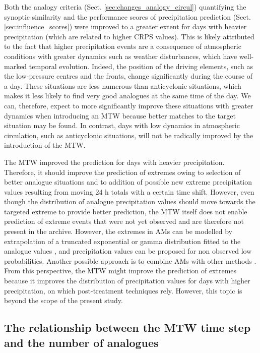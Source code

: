\documentclass[hess, manuscript]{copernicus}
\begin{document}
	Both the analogy criteria (Sect. \ref{sec:changes_analogy_circul}) quantifying the synoptic similarity and the performance scores of precipitation prediction (Sect. \ref{sec:influence_scores}) were improved to a greater extent for days with heavier precipitation (which are related to higher CRPS values). This is likely attributed to the fact that higher precipitation events are a consequence of atmospheric conditions with greater dynamics such as weather disturbances, which have well-marked temporal evolution. Indeed, the position of the driving elements, such as the low-pressure centres and the fronts, change significantly during the course of a day. These situations are less numerous than anticyclonic situations, which makes it less likely to find very good analogues at the same time of the day. We can, therefore, expect to more significantly improve these situations with greater dynamics when introducing an MTW because better matches to the target situation may be found. In contrast, days with low dynamics in atmospheric circulation, such as anticyclonic situations, will not be radically improved by the introduction of the MTW.
	
	The MTW improved the prediction for days with heavier precipitation. Therefore, it should improve the prediction of extremes owing to selection of better analogue situations and to addition of possible new extreme precipitation values resulting from moving 24 h totals with a certain time shift. However, even though the distribution of analogue precipitation values should move towards the targeted extreme to provide better prediction, the MTW itself does not enable prediction of extreme events that were not yet observed and are therefore not present in the archive. However, the extremes in AMs can be modelled by extrapolation of a truncated exponential or gamma distribution fitted to the analogue values \citep{Obled2002}, and precipitation values can be proposed for non observed low probabilities. Another possible approach is to combine AMs with other methods \citep[e.g.][]{Chardon2017}. From this perspective, the MTW might improve the prediction of extremes because it improves the distribution of precipitation values for days with higher precipitation, on which post-treatment techniques rely. However, this topic is beyond the scope of the present study.
	
	
	\subsection{The relationship between the MTW time step and the number of analogues}
	\label{sec:increase_analognb}
	
\end{document}
